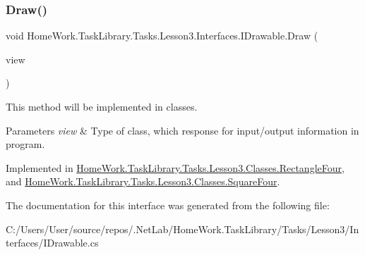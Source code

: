 \subsubsection{\texorpdfstring{Draw()}{Draw()}}
{\footnotesize\ttfamily void Home\+Work.\+Task\+Library.\+Tasks.\+Lesson3.\+Interfaces.\+I\+Drawable.\+Draw (\begin{DoxyParamCaption}\item[{I\+Information}]{view }\end{DoxyParamCaption})}



This method will be implemented in classes. 


\begin{DoxyParams}{Parameters}
{\em view} & Type of class, which response for input/output information in program.\\
\hline
\end{DoxyParams}


Implemented in \mbox{\hyperlink{class_home_work_1_1_task_library_1_1_tasks_1_1_lesson3_1_1_classes_1_1_rectangle_four_a4e85c8eec4572cfbf0a0bb56858281f8}{Home\+Work.\+Task\+Library.\+Tasks.\+Lesson3.\+Classes.\+Rectangle\+Four}}, and \mbox{\hyperlink{class_home_work_1_1_task_library_1_1_tasks_1_1_lesson3_1_1_classes_1_1_square_four_ab98dd68e8b6002eeddae5df4168e4633}{Home\+Work.\+Task\+Library.\+Tasks.\+Lesson3.\+Classes.\+Square\+Four}}.



The documentation for this interface was generated from the following file\+:\begin{DoxyCompactItemize}
\item 
C\+:/\+Users/\+User/source/repos/.\+Net\+Lab/\+Home\+Work.\+Task\+Library/\+Tasks/\+Lesson3/\+Interfaces/I\+Drawable.\+cs\end{DoxyCompactItemize}
